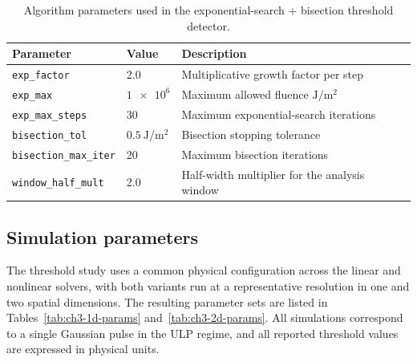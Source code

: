 \begin{table}[htbp]
    \centering
    \caption{Algorithm parameters used in the exponential-search + bisection threshold detector.}
    \label{tab:ch3-alg-params}
    \begin{tabular}{@{}lll@{}}
        \toprule
        \rowcolor{gray!20}
        \textbf{Parameter}            & \textbf{Value}                        & \textbf{Description}                                     \\
        \midrule
        \texttt{exp\_factor}          & 2.0                                   & Multiplicative growth factor per step                    \\
        \texttt{exp\_max}             & \(\num{1e6}\)                         & Maximum allowed fluence \(\si{\joule\per\square\metre}\) \\
        \texttt{exp\_max\_steps}      & 30                                    & Maximum exponential-search iterations                    \\
        \texttt{bisection\_tol}       & \(\SI{0.5}{\joule\per\square\metre}\) & Bisection stopping tolerance                             \\
        \texttt{bisection\_max\_iter} & 20                                    & Maximum bisection iterations                             \\
        \texttt{window\_half\_mult}   & 2.0                                   & Half-width multiplier for the analysis window            \\
        \bottomrule
    \end{tabular}
\end{table}

\subsection{Simulation parameters}
\label{sec:ch3-ablation-simparams}

The threshold study uses a common physical configuration across the linear
and nonlinear solvers, with both variants run at a representative
resolution in one and two spatial dimensions. The resulting parameter sets
are listed in Tables~\ref{tab:ch3-1d-params} and~\ref{tab:ch3-2d-params}.
All simulations correspond to a single Gaussian pulse in the ULP regime,
and all reported threshold values are expressed in physical units.

